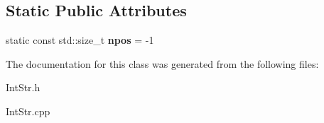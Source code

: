 \subsection*{Static Public Attributes}
\begin{DoxyCompactItemize}
\item 
\mbox{\label{classInt__Str_ae168eec8cfc26ee125a8daf7ea2b434b}} 
static const std\+::size\+\_\+t {\bfseries npos} = -\/1
\end{DoxyCompactItemize}


The documentation for this class was generated from the following files\+:\begin{DoxyCompactItemize}
\item 
Int\+Str.\+h\item 
Int\+Str.\+cpp\end{DoxyCompactItemize}

